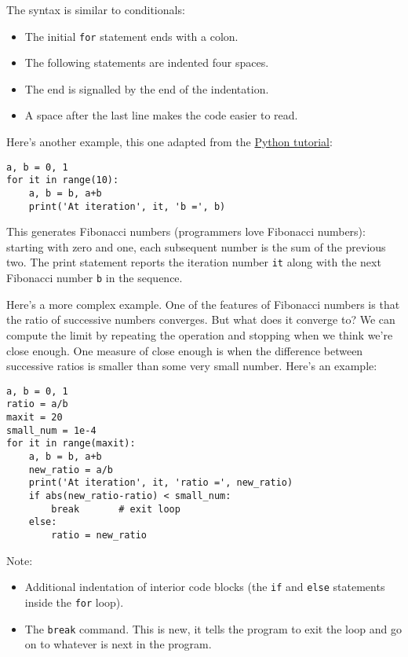 \documentclass[11pt]{article}
\begin{document}
\begin{itemize}
The syntax is similar to conditionals:
\begin{itemize}
\item The initial {\tt for} statement ends with a colon.
\item The following statements are indented four spaces.
\item The end is signalled by the end of the indentation.
\item A space after the last line makes the code easier to read.
\end{itemize}


Here's another example, this one adapted from the
\href{https://docs.python.org/3/tutorial/introduction.html#first-steps-towards-programming}{Python tutorial}:
%
\begin{verbatim}
a, b = 0, 1
for it in range(10):
    a, b = b, a+b
    print('At iteration', it, 'b =', b)
\end{verbatim}
This generates Fibonacci numbers
(programmers love Fibonacci numbers):
starting with zero and one, each subsequent number is the sum of the previous two.
The print statement reports the iteration number {\tt it} along with the next Fibonacci number {\tt b}
in the sequence.


Here's a more complex example.
One of the features of Fibonacci numbers is that the ratio of
successive numbers converges.
But what does it converge to?
We can compute the limit by repeating the operation and
stopping when we think we're close enough.
One measure of close enough is when the difference
between successive ratios is smaller than some very small number.
Here's an example:
\begin{verbatim}
a, b = 0, 1
ratio = a/b
maxit = 20
small_num = 1e-4
for it in range(maxit):
    a, b = b, a+b
    new_ratio = a/b
    print('At iteration', it, 'ratio =', new_ratio)
    if abs(new_ratio-ratio) < small_num:
        break       # exit loop
    else:
        ratio = new_ratio
\end{verbatim}
Note:
\begin{itemize}
\item Additional indentation of interior code blocks
(the {\tt if} and {\tt else} statements inside the {\tt for} loop).
\item The {\tt break} command.
This is new, it tells the program to exit the loop and go on to whatever
is next in the program.
\end{itemize}


\end{itemize}
\end{document}
